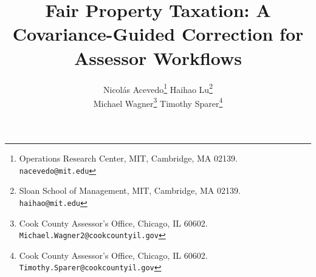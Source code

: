 \documentclass[10pt]{article}
\title{Fair Property Taxation:
A Covariance-Guided Correction for Assessor Workflows}
\author{
Nicol\'as Acevedo\thanks{Operations Research Center, MIT, Cambridge, MA 02139. \texttt{nacevedo@mit.edu}}
\qquad
Haihao Lu\thanks{Sloan School of Management, MIT, Cambridge, MA 02139. \texttt{haihao@mit.edu}}
\\[1ex]
Michael Wagner\thanks{Cook County Assessor's Office, Chicago, IL 60602. \texttt{Michael.Wagner2@cookcountyil.gov}}
\qquad
Timothy Sparer\thanks{Cook County Assessor's Office, Chicago, IL 60602. \texttt{Timothy.Sparer@cookcountyil.gov}}
}
\date{}
\theoremstyle{definition}
\newcommand{\1}{\mathbf{1}}
\newcommand{\oldtext}[1]{\textcolor{blue}{\sout{#1}}}
\newcommand{\newtext}[1]{\textcolor{impGreen}{#1}}
\begin{document}
\maketitle


\begin{abstract}


\end{abstract}
\end{document}
